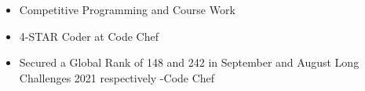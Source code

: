 \smallskip


\begin{itemize}
\item \textcolor{emphasis}{Competitive Programming and Course Work}
\smallskip
\end{itemize}












\begin{itemize}
    \item 4-STAR Coder at Code Chef
    \item Secured a Global Rank of 148 and 242 in September and August Long Challenges 2021 respectively -Code Chef

   
    
    
\end{itemize}








\clearpage


\nocite{*}


















